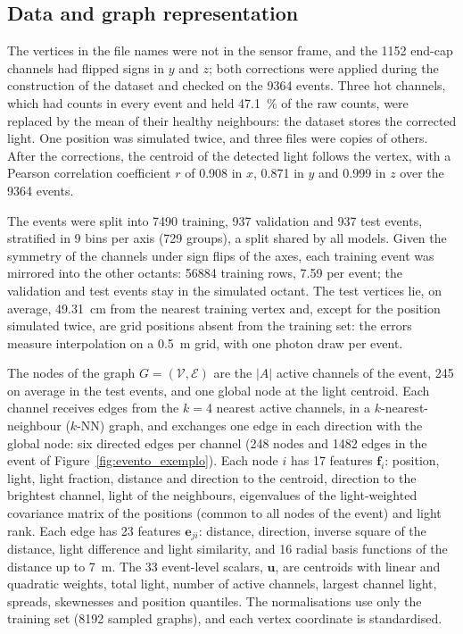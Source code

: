 \subsection{Data and graph representation}
\label{sec:dados_grafos}

The vertices in the file names were not in the sensor frame, and the \num{1152} end-cap channels had flipped signs in $y$ and $z$; both corrections were applied during the construction of the dataset and checked on the \num{9364} events. Three hot channels, which had counts in every event and held \qty{47.1}{\percent} of the raw counts, were replaced by the mean of their healthy neighbours: the dataset stores the corrected light. One position was simulated twice, and three files were copies of others. After the corrections, the centroid of the detected light follows the vertex, with a Pearson correlation coefficient $r$ of \num{0.908} in $x$, \num{0.871} in $y$ and \num{0.999} in $z$ over the \num{9364} events.

The events were split into \num{7490} training, \num{937} validation and \num{937} test events, stratified in \num{9} bins per axis (\num{729} groups), a split shared by all models. Given the symmetry of the channels under sign flips of the axes, each training event was mirrored into the other octants: \num{56884} training rows, \num{7.59} per event; the validation and test events stay in the simulated octant. The test vertices lie, on average, \qty{49.31}{\cm} from the nearest training vertex and, except for the position simulated twice, are grid positions absent from the training set: the errors measure interpolation on a \qty{0.5}{\m} grid, with one photon draw per event.

The nodes of the graph $G = (\mathcal{V}, \mathcal{E})$ are the $|A|$ active channels of the event, \num{245} on average in the test events, and one global node \citep{gilmer2017neural} at the light centroid. Each channel receives edges from the $k = {}$\num{4} nearest active channels, in a $k$-nearest-neighbour (\mbox{$k$-NN}) graph, and exchanges one edge in each direction with the global node: six directed edges per channel (\num{248} nodes and \num{1482} edges in the event of Figure~\ref{fig:evento_exemplo}). Each node $i$ has \num{17} features $\mathbf{f}_i$: position, light, light fraction, distance and direction to the centroid, direction to the brightest channel, light of the neighbours, eigenvalues of the light-weighted covariance matrix of the positions (common to all nodes of the event) and light rank. Each edge has \num{23} features $\mathbf{e}_{ji}$: distance, direction, inverse square of the distance, light difference and light similarity, and \num{16} radial basis functions of the distance up to \qty{7}{\m}. The \num{33} event-level scalars, $\mathbf{u}$, are centroids with linear and quadratic weights, total light, number of active channels, largest channel light, spreads, skewnesses and position quantiles. The normalisations use only the training set (\num{8192} sampled graphs), and each vertex coordinate is standardised.
